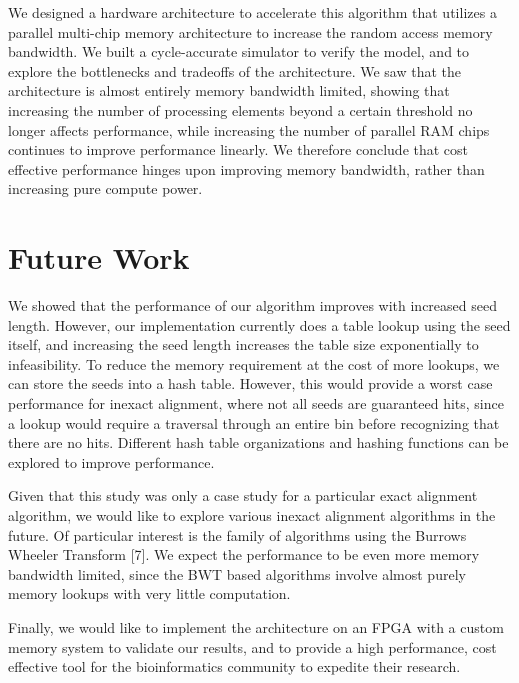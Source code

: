 \documentclass[11pt]{article}
\begin{document}
We designed a hardware architecture to accelerate this algorithm that utilizes a parallel multi-chip memory architecture to increase the random access memory bandwidth.  We built a cycle-accurate simulator to verify the model, and to explore the bottlenecks and tradeoffs of the architecture.  We saw that the architecture is almost entirely memory bandwidth limited, showing that increasing the number of processing elements beyond a certain threshold no longer affects performance, while increasing the number of parallel RAM chips continues to improve performance linearly.  We therefore conclude that cost effective performance hinges upon improving memory bandwidth, rather than increasing pure compute power.

\section{Future Work}

We showed that the performance of our algorithm improves with increased seed length.  However, our implementation currently does a table lookup using the seed itself, and increasing the seed length increases the table size exponentially to infeasibility.  To reduce the memory requirement at the cost of more lookups, we can store the seeds into a hash table.  However, this would provide a worst case performance for inexact alignment, where not all seeds are guaranteed hits, since a lookup would require a traversal through an entire bin before recognizing that there are no hits.  Different hash table organizations and hashing functions can be explored to improve performance.


Given that this study was only a case study for a particular exact alignment algorithm, we would like to explore various inexact alignment algorithms in the future.  Of particular interest is the family of algorithms using the Burrows Wheeler Transform [7].  We expect the performance to be even more memory bandwidth limited, since the BWT based algorithms involve almost purely memory lookups with very little computation.


Finally, we would like to implement the architecture on an FPGA with a custom memory system to validate our results, and to provide a high performance, cost effective tool for the bioinformatics community to expedite their research.





{
  
}
\end{document}
